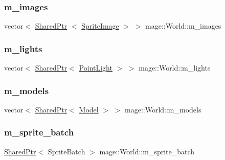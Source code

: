 \subsubsection{\texorpdfstring{m\+\_\+images}{m\_images}}
{\footnotesize\ttfamily vector$<$ \hyperlink{namespacemage_a1e01ae66713838a7a67d30e44c67703e}{Shared\+Ptr} $<$ \hyperlink{classmage_1_1_sprite_image}{Sprite\+Image} $>$ $>$ mage\+::\+World\+::m\+\_\+images\hspace{0.3cm}{\ttfamily [private]}}

\hypertarget{classmage_1_1_world_a781af9ce8b1e03c5c606e3523323005b}{}\label{classmage_1_1_world_a781af9ce8b1e03c5c606e3523323005b} 
\subsubsection{\texorpdfstring{m\+\_\+lights}{m\_lights}}
{\footnotesize\ttfamily vector$<$ \hyperlink{namespacemage_a1e01ae66713838a7a67d30e44c67703e}{Shared\+Ptr}$<$ \hyperlink{classmage_1_1_point_light}{Point\+Light} $>$ $>$ mage\+::\+World\+::m\+\_\+lights\hspace{0.3cm}{\ttfamily [private]}}

\hypertarget{classmage_1_1_world_ad69d681d960e32f62800bfcfa88d7737}{}\label{classmage_1_1_world_ad69d681d960e32f62800bfcfa88d7737} 
\subsubsection{\texorpdfstring{m\+\_\+models}{m\_models}}
{\footnotesize\ttfamily vector$<$ \hyperlink{namespacemage_a1e01ae66713838a7a67d30e44c67703e}{Shared\+Ptr}$<$ \hyperlink{classmage_1_1_model}{Model} $>$ $>$ mage\+::\+World\+::m\+\_\+models\hspace{0.3cm}{\ttfamily [private]}}

\hypertarget{classmage_1_1_world_abb5d26cbfbd7b5792a53359b823c9f37}{}\label{classmage_1_1_world_abb5d26cbfbd7b5792a53359b823c9f37} 
\subsubsection{\texorpdfstring{m\+\_\+sprite\+\_\+batch}{m\_sprite\_batch}}
{\footnotesize\ttfamily \hyperlink{namespacemage_a1e01ae66713838a7a67d30e44c67703e}{Shared\+Ptr}$<$ Sprite\+Batch $>$ mage\+::\+World\+::m\+\_\+sprite\+\_\+batch\hspace{0.3cm}{\ttfamily [private]}}

